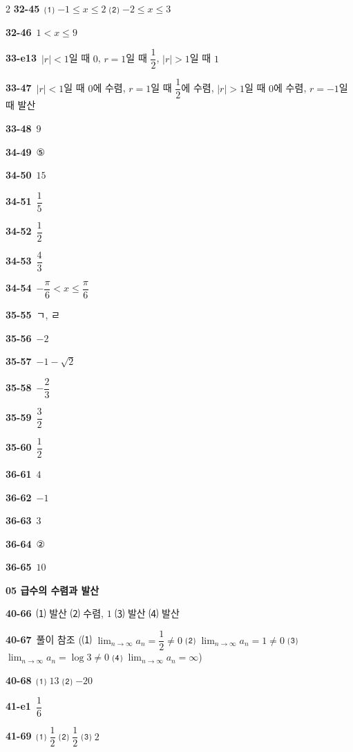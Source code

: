 \documentclass[10pt,a4paper]{article}
\begin{document}
\begin{multicols}{2}
\noindent\textbf{32-45}\ ⑴ $-1\le x\le 2$ ⑵ $-2\le x\le 3$\par
\noindent\textbf{32-46}\ $1<x\le 9$\par
\noindent\textbf{33-e13}\ $|r|<1$일 때 $0$, $r=1$일 때 $\dfrac{1}{2}$, $|r|>1$일 때 $1$\par
\noindent\textbf{33-47}\ $|r|<1$일 때 $0$에 수렴, $r=1$일 때 $\dfrac{1}{2}$에 수렴, $|r|>1$일 때 $0$에 수렴, $r=-1$일 때 발산\par
\noindent\textbf{33-48}\ $9$\par
\noindent\textbf{34-49}\ ⑤\par
\noindent\textbf{34-50}\ $15$\par
\noindent\textbf{34-51}\ $\dfrac{1}{5}$\par
\noindent\textbf{34-52}\ $\dfrac{1}{2}$\par
\noindent\textbf{34-53}\ $\dfrac{4}{3}$\par
\noindent\textbf{34-54}\ $-\dfrac{\pi}{6}<x\le\dfrac{\pi}{6}$\par
\noindent\textbf{35-55}\ ㄱ, ㄹ\par
\noindent\textbf{35-56}\ $-2$\par
\noindent\textbf{35-57}\ $-1-\sqrt{2}$\par
\noindent\textbf{35-58}\ $-\dfrac{2}{3}$\par
\noindent\textbf{35-59}\ $\dfrac{3}{2}$\par
\noindent\textbf{35-60}\ $\dfrac{1}{2}$\par
\noindent\textbf{36-61}\ $4$\par
\noindent\textbf{36-62}\ $-1$\par
\noindent\textbf{36-63}\ $3$\par
\noindent\textbf{36-64}\ ②\par
\noindent\textbf{36-65}\ $10$\par
\noindent\textbf{05 급수의 수렴과 발산}\par\smallskip
\noindent\textbf{40-66}\ ⑴ 발산 ⑵ 수렴, $1$ ⑶ 발산 ⑷ 발산\par
\noindent\textbf{40-67}\ 풀이 참조 (⑴ $\displaystyle\lim_{n\to\infty} a_n=\dfrac{1}{2}\ne 0$ ⑵ $\displaystyle\lim_{n\to\infty} a_n=1\ne 0$ ⑶ $\displaystyle\lim_{n\to\infty} a_n=\log 3\ne 0$ ⑷ $\displaystyle\lim_{n\to\infty} a_n=\infty$)\par
\noindent\textbf{40-68}\ ⑴ $13$ ⑵ $-20$\par
\noindent\textbf{41-e1}\ $\dfrac{1}{6}$\par
\noindent\textbf{41-69}\ ⑴ $\dfrac{1}{2}$ ⑵ $\dfrac{1}{2}$ ⑶ $2$\par

\end{multicols}
\end{document}
